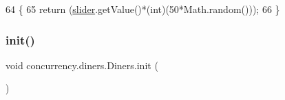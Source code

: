 \begin{DoxyCode}
64                          \{
65         \textcolor{keywordflow}{return} (\mbox{\hyperlink{classconcurrency_1_1diners_1_1_diners_a39973398065942d8583b0c74d4c2365f}{slider}}.getValue()*(int)(50*Math.random()));
66     \}
\end{DoxyCode}
\mbox{\label{classconcurrency_1_1diners_1_1_diners_a8fa1aaa0013516431481bc274e86717a}} 
\subsubsection{\texorpdfstring{init()}{init()}}
{\footnotesize\ttfamily void concurrency.\+diners.\+Diners.\+init (\begin{DoxyParamCaption}{ }\end{DoxyParamCaption})\hspace{0.3cm}{\ttfamily [inline]}}


